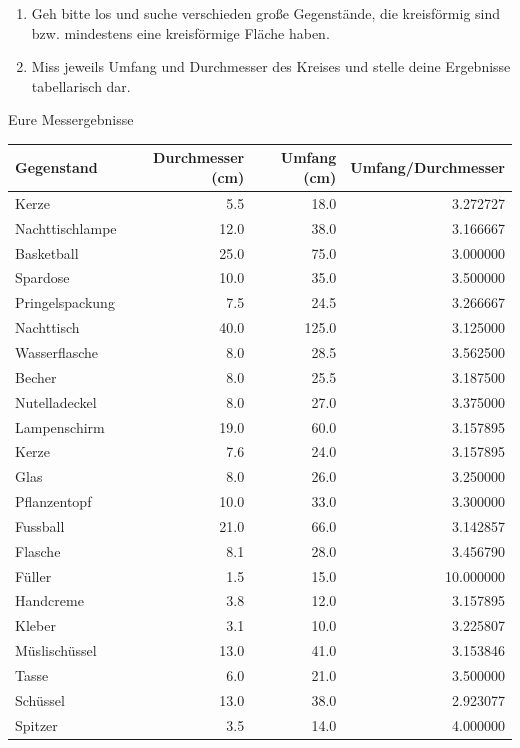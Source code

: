 \documentclass[
  ngerman,
]{book}
\begin{document}
\begin{enumerate}
\def\labelenumi{\arabic{enumi}.}
\item
  Geh bitte los und suche verschieden große Gegenstände, die kreisförmig sind bzw. mindestens eine kreisförmige Fläche haben.
\item
  Miss jeweils Umfang und Durchmesser des Kreises und stelle deine Ergebnisse tabellarisch dar.
\end{enumerate}

Eure Messergebnisse

\begin{table}[H]
\centering
\begin{tabular}[t]{l|r|r|r}
\hline
Gegenstand & Durchmesser (cm) & Umfang (cm) & Umfang/Durchmesser\\
\hline
Kerze & 5.5 & 18.0 & 3.272727\\
\hline
Nachttischlampe & 12.0 & 38.0 & 3.166667\\
\hline
Basketball & 25.0 & 75.0 & 3.000000\\
\hline
Spardose & 10.0 & 35.0 & 3.500000\\
\hline
Pringelspackung & 7.5 & 24.5 & 3.266667\\
\hline
Nachttisch & 40.0 & 125.0 & 3.125000\\
\hline
Wasserflasche & 8.0 & 28.5 & 3.562500\\
\hline
Becher & 8.0 & 25.5 & 3.187500\\
\hline
Nutelladeckel & 8.0 & 27.0 & 3.375000\\
\hline
Lampenschirm & 19.0 & 60.0 & 3.157895\\
\hline
Kerze & 7.6 & 24.0 & 3.157895\\
\hline
Glas & 8.0 & 26.0 & 3.250000\\
\hline
Pflanzentopf & 10.0 & 33.0 & 3.300000\\
\hline
Fussball & 21.0 & 66.0 & 3.142857\\
\hline
Flasche & 8.1 & 28.0 & 3.456790\\
\hline
Füller & 1.5 & 15.0 & 10.000000\\
\hline
Handcreme & 3.8 & 12.0 & 3.157895\\
\hline
Kleber & 3.1 & 10.0 & 3.225807\\
\hline
Müslischüssel & 13.0 & 41.0 & 3.153846\\
\hline
Tasse & 6.0 & 21.0 & 3.500000\\
\hline
Schüssel & 13.0 & 38.0 & 2.923077\\
\hline
Spitzer & 3.5 & 14.0 & 4.000000\\

\end{tabular}
\end{table}
\end{document}
